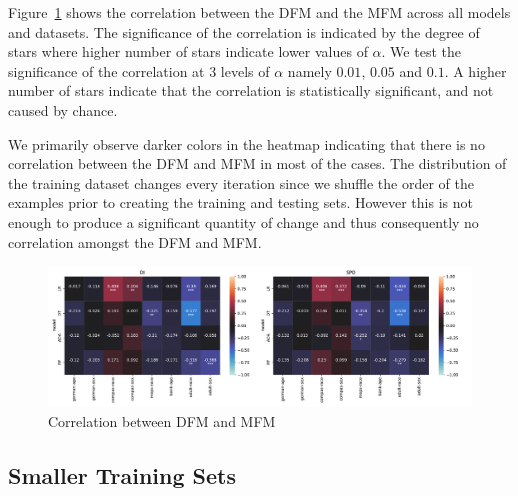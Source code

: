 \documentclass{article}
\begin{document}
Figure \ref{fig:heatmap--corr--full-data} shows the correlation between
the DFM and the MFM across all models and datasets. The significance
of the correlation is indicated by the degree of stars where higher
number of stars indicate lower values of $\alpha$. We test the
significance of the correlation at 3 levels of $\alpha$ namely $0.01$,
$0.05$ and $0.1$. A higher number of stars indicate that the
correlation is statistically significant, and not caused by chance.

We primarily observe darker colors in the heatmap indicating that
there is no correlation between the DFM and MFM in most of the cases.
The distribution of the training dataset changes every iteration since
we shuffle the order of the examples prior to creating the training
and testing sets. However this is not enough to produce a significant
quantity of change and thus consequently no correlation amongst the
DFM and MFM.



\begin{figure}
  \centering
  \includegraphics[width=0.95\linewidth]{heatmap--corr--full-data.pdf}
  \caption{Correlation between DFM and MFM}
  \label{fig:heatmap--corr--full-data}
\end{figure}

\subsection{Smaller Training Sets}\label{sec:results-smaller-data}

\end{document}
